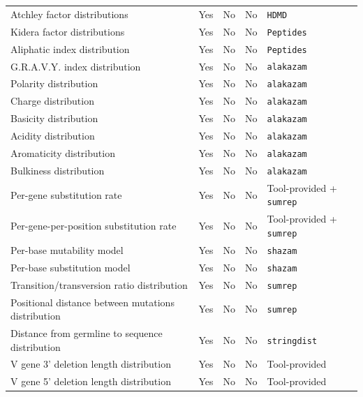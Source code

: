 \documentclass{article}
\begin{document}
\begin{table}
{\begin{tabular}{l|c|c|c|l}
    Atchley factor distributions & Yes & No & No & \texttt{HDMD} \cite{McFerrin13-ng} \\
    Kidera factor distributions & Yes & No & No & \texttt{Peptides} \cite{McFerrin13-ng} \\
Aliphatic index distribution & Yes & No & No & \texttt{Peptides} \\
    G.R.A.V.Y. index distribution & Yes & No & No & \texttt{alakazam} \cite{Gupta2015-iu} \\
    Polarity distribution & Yes & No & No & \texttt{alakazam} \\
    Charge distribution & Yes & No & No & \texttt{alakazam} \\
    Basicity distribution & Yes & No & No & \texttt{alakazam} \\
    Acidity distribution & Yes & No & No & \texttt{alakazam} \\
    Aromaticity distribution & Yes & No & No & \texttt{alakazam} \\
    Bulkiness distribution & Yes & No & No & \texttt{alakazam} \\
Per-gene substitution rate & Yes & No & No & Tool-provided + \texttt{sumrep} \\
Per-gene-per-position substitution rate & Yes & No & No & Tool-provided + \texttt{sumrep} \\
Per-base mutability model & Yes & No & No & \texttt{shazam} \cite{Gupta2015-iu} \\
Per-base substitution model & Yes & No & No & \texttt{shazam} \\
Transition/transversion ratio distribution & Yes & No & No & \texttt{sumrep} \\
Positional distance between mutations distribution & Yes & No & No & \texttt{sumrep}  \\
Distance from germline to sequence distribution & Yes & No & No & \texttt{stringdist} \\
V gene 3' deletion length distribution & Yes & No & No & Tool-provided \\
V gene 5' deletion length distribution & Yes & No & No & Tool-provided \\

\end{tabular}}
\end{table}
\end{document}
